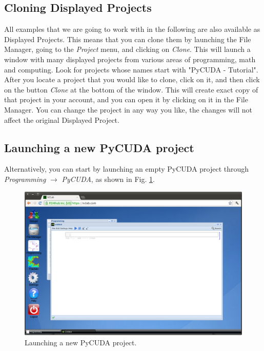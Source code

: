 \documentclass[article,A4,12pt]{llncs}
\begin{document}
\subsection{Cloning Displayed Projects}

All examples that we are going to work with in the following are also available 
as Displayed Projects. This means that you can clone them by launching the File
Manager, going to the {\em Project} menu, and clicking on {\em Clone}. This will launch 
a window with many displayed projects from various areas of programming,
math and computing. Look for projects whose names start with "PyCUDA - Tutorial".
After you locate a project that you would like to clone, click on it,
and then click on the button {\em Clone} at the bottom of the window. This will
create exact copy of that project in your account, and you can open it 
by clicking on it in the File Manager. You can change the project in any way 
you like, the changes will not affect the original Displayed Project. 


\subsection{Launching a new PyCUDA project}

Alternatively, you can start by launching an empty PyCUDA project through 
{\em Programming} $\rightarrow$ {\em PyCUDA}, as shown in Fig. \ref{fig:pycuda}.


\begin{figure}[!ht]
\begin{center}
\includegraphics[width=\textwidth]{img/pycuda.png}
\end{center}
\caption{Launching a new PyCUDA project.}
\label{fig:pycuda}
\end{figure}
\noindent
\end{document}
